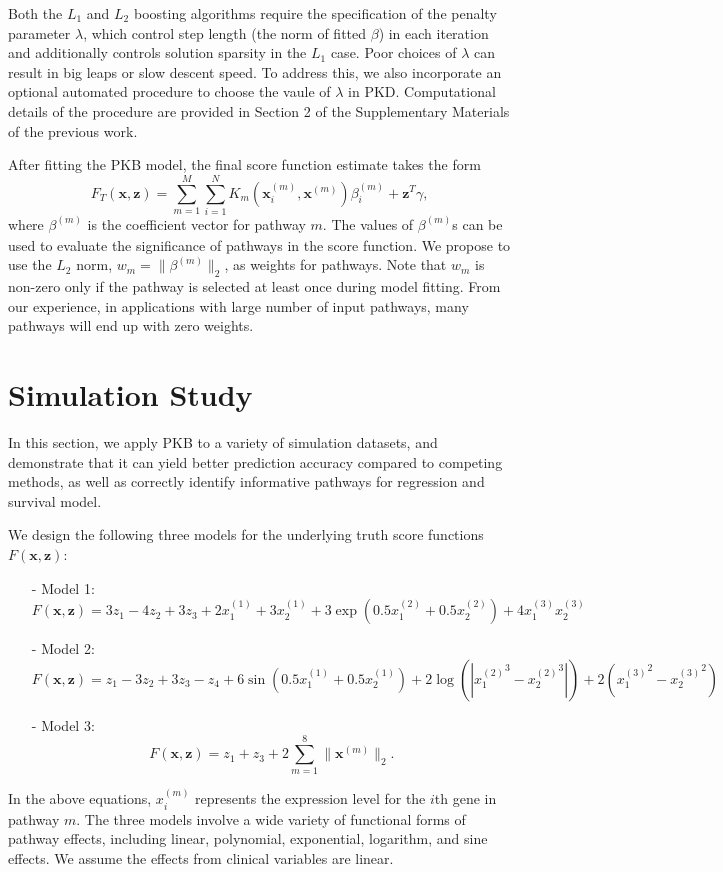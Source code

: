 \documentclass[a4paper,12pt]{article}
\newcommand{\bd}[1]{\mathbf{#1}}
\newcommand{\pathexpr}[3]{{#1}_{#2}^{(#3)}}
\begin{document}
Both the $L_1$ and $L_2$ boosting algorithms require the specification of the penalty parameter $\lambda$, which control step length (the norm of fitted $\beta$) in each iteration and additionally controls solution sparsity in the $L_1$ case. Poor choices of $\lambda$ can result in big leaps or slow descent speed. To address this, we also incorporate an optional automated procedure to choose the vaule of $\lambda$ in PKD. Computational details of the procedure are provided in Section 2 of the Supplementary Materials of the previous work.\cite{zeng2019pathway}

After fitting the PKB model, the final score function estimate takes the form
$$F_T(\bd{x}, \bd{z}) = \sum_{m=1}^M \sum_{i=1}^N K_m(\pathexpr{\bd{x}}{i}{m},\pathexpr{\bd{x}}{}{m})\pathexpr{\beta}{i}{m} + \bd{z}^T \gamma,$$
where $\pathexpr{\beta}{}{m}$ is the coefficient vector for pathway $m$. The values of $\pathexpr{\beta}{}{m}$s can be used to evaluate the significance of pathways in the score function. We propose to use the $L_2$ norm, $w_m = \|\beta^{(m)}\|_2$, as weights for pathways. Note that $w_m$ is non-zero only if the pathway is selected at least once during model fitting. From our experience, in applications with large number of input pathways, many pathways will end up with zero weights.

\section{Simulation Study}\label{simu}
In this section, we apply PKB to a variety of simulation datasets, and demonstrate that it can yield better prediction accuracy compared to competing methods, as well as correctly identify informative pathways for regression and survival model. 

We design the following three models for the underlying truth score functions $F(\bd{x},\bd{z})$:
\begin{itemize}
	\item[-] Model 1:
	$$F(\bd{x},\bd{z}) = 3z_1 - 4z_2 + 3z_3 + 2\pathexpr{x}{1}{1}+3\pathexpr{x}{2}{1}+ 
	3\exp(0.5\pathexpr{x}{1}{2} + 0.5\pathexpr{x}{2}{2}) + 4\pathexpr{x}{1}{3}\pathexpr{x}{2}{3}$$
	\item[-] Model 2:
	$$F(\bd{x},\bd{z}) = z_1 - 3z_2 + 3z_3 - z_4 + 6\sin(0.5\pathexpr{x}{1}{1} + 0.5\pathexpr{x}{2}{1}) + 2\log(|{\pathexpr{x}{1}{2}}^3 - {\pathexpr{x}{2}{2}}^3|) + 2({\pathexpr{x}{1}{3}}^2-{\pathexpr{x}{2}{3}}^2)$$
	\item[-] Model 3:
	$$F(\bd{x},\bd{z}) = z_1 + z_3 + 2\sum_{m=1}^{8} \|\pathexpr{\bd{x}}{}{m}\|_2.$$
\end{itemize}
In the above equations, $\pathexpr{x}{i}{m}$ represents the  expression level for the $i$th gene in pathway $m$. The three models involve a wide variety of functional forms of pathway effects, including linear, polynomial, exponential, logarithm, and sine effects. We assume the effects from clinical variables are linear. 
\end{document}

